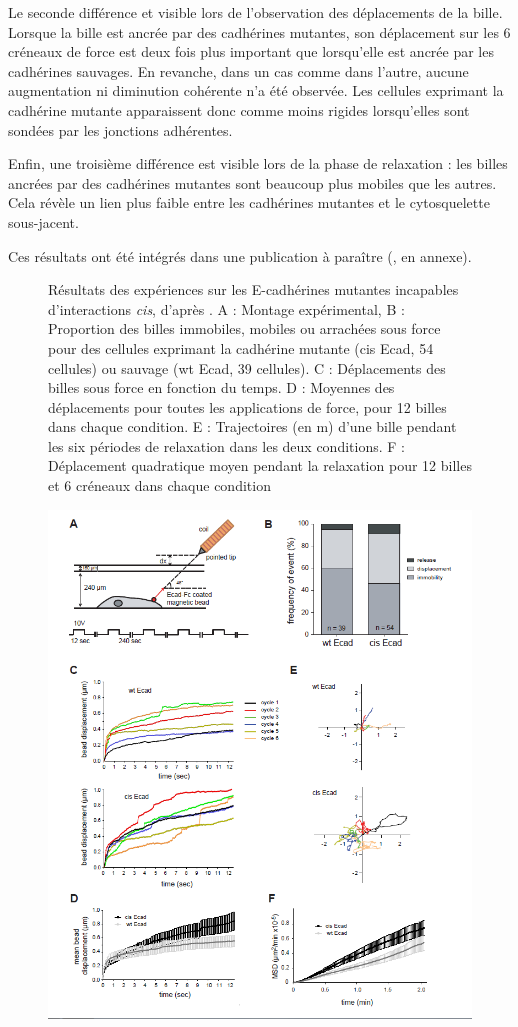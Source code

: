  Le seconde différence et visible lors de l'observation des déplacements de la bille. Lorsque la bille est ancrée par des cadhérines mutantes, son déplacement sur les 6 créneaux de force est deux fois plus important que lorsqu'elle est ancrée par les cadhérines sauvages. En revanche, dans un cas comme dans l'autre, aucune augmentation ni diminution cohérente n'a été observée. Les cellules exprimant la cadhérine mutante apparaissent donc comme moins rigides lorsqu'elles sont sondées par les jonctions adhérentes. 
 
 Enfin, une troisième différence est visible lors de la phase de relaxation : les billes ancrées par des cadhérines mutantes sont beaucoup plus mobiles que les autres. Cela révèle un lien plus faible entre les cadhérines mutantes et le cytosquelette sous-jacent. 

 Ces résultats ont été intégrés dans une publication à paraître (\cite{strale_formation_2012}, en annexe).
 \newpage

 \begin{figure}[h!]
\caption{\small Résultats des expériences sur les E-cadhérines mutantes incapables d'interactions \textit{cis}, d'après \cite{Strale}. A : Montage expérimental, B : Proportion des billes immobiles, mobiles ou arrachées sous force pour des cellules exprimant la cadhérine mutante (cis Ecad, 54 cellules) ou sauvage (wt Ecad, 39 cellules). C : Déplacements des billes sous force en fonction du temps. D : Moyennes des déplacements pour toutes les applications de force, pour 12 billes dans chaque condition. E : Trajectoires (en \micro m) d'une bille pendant les six périodes de relaxation dans les deux conditions. F : Déplacement quadratique moyen pendant la relaxation pour 12 billes et 6 créneaux dans chaque condition}
\end{figure} 
     
 \begin{figure}
 \includegraphics[scale=0.7]{Figures/Strale.png} 

 \end{figure}


 
 
 
 
%
